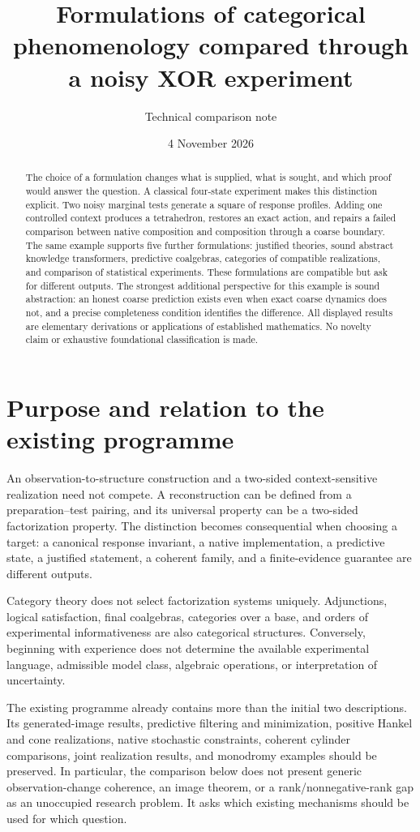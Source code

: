 \documentclass[11pt]{article}
\title{Formulations of categorical phenomenology compared through a noisy XOR experiment}
\author{Technical comparison note}
\date{4 November 2026}
\theoremstyle{definition}
\begin{document}
\maketitle
\begin{abstract}
The choice of a formulation changes what is supplied, what is sought, and which proof would answer the question. A classical four-state experiment makes this distinction explicit. Two noisy marginal tests generate a square of response profiles. Adding one controlled context produces a tetrahedron, restores an exact action, and repairs a failed comparison between native composition and composition through a coarse boundary. The same example supports five further formulations: justified theories, sound abstract knowledge transformers, predictive coalgebras, categories of compatible realizations, and comparison of statistical experiments. These formulations are compatible but ask for different outputs. The strongest additional perspective for this example is sound abstraction: an honest coarse prediction exists even when exact coarse dynamics does not, and a precise completeness condition identifies the difference. All displayed results are elementary derivations or applications of established mathematics. No novelty claim or exhaustive foundational classification is made.
\end{abstract}

\section{Purpose and relation to the existing programme}
An observation-to-structure construction and a two-sided context-sensitive realization need not compete. A reconstruction can be defined from a preparation--test pairing, and its universal property can be a two-sided factorization property. The distinction becomes consequential when choosing a target: a canonical response invariant, a native implementation, a predictive state, a justified statement, a coherent family, and a finite-evidence guarantee are different outputs.

Category theory does not select factorization systems uniquely. Adjunctions, logical satisfaction, final coalgebras, categories over a base, and orders of experimental informativeness are also categorical structures. Conversely, beginning with experience does not determine the available experimental language, admissible model class, algebraic operations, or interpretation of uncertainty.

The existing programme already contains more than the initial two descriptions. Its generated-image results, predictive filtering and minimization, positive Hankel and cone realizations, native stochastic constraints, coherent cylinder comparisons, joint realization results, and monodromy examples should be preserved. In particular, the comparison below does not present generic observation-change coherence, an image theorem, or a rank/nonnegative-rank gap as an unoccupied research problem. It asks which existing mechanisms should be used for which question.
\end{document}
